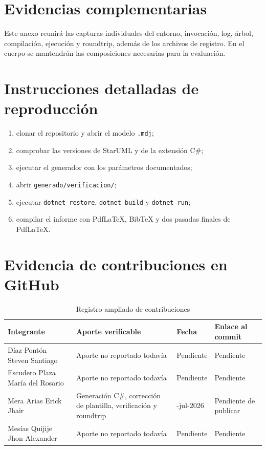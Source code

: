 \documentclass[12pt,a4paper]{article}
\begin{document}
\section{Evidencias complementarias}

Este anexo reunirá las capturas individuales del entorno, invocación, log,
árbol, compilación, ejecución y roundtrip, además de los archivos de registro.
En el cuerpo se mantendrán las composiciones necesarias para la evaluación.

\section{Instrucciones detalladas de reproducción}

\begin{enumerate}[nosep]
  \item clonar el repositorio y abrir el modelo \texttt{.mdj};
  \item comprobar las versiones de StarUML y de la extensión C\#;
  \item ejecutar el generador con los parámetros documentados;
  \item abrir \texttt{generado/verificacion/};
  \item ejecutar \texttt{dotnet restore}, \texttt{dotnet build} y \texttt{dotnet run};
  \item compilar el informe con PdfLaTeX, BibTeX y dos pasadas finales de
  PdfLaTeX.
\end{enumerate}

\section{Evidencia de contribuciones en GitHub}

\begin{table}[htbp]
  \centering
  \caption{Registro ampliado de contribuciones}
  \footnotesize
  \begin{tabularx}{\textwidth}{>{\raggedright\arraybackslash}p{3.5cm}X
    >{\raggedright\arraybackslash}p{2.5cm}
    >{\raggedright\arraybackslash}p{3cm}}
    \toprule
    Integrante & Aporte verificable & Fecha & Enlace al commit \\
    \midrule
    Díaz Pontón Steven Santiago & Aporte no reportado todavía & Pendiente & Pendiente \\
    Escudero Plaza María del Rosario & Aporte no reportado todavía & Pendiente & Pendiente \\
    Mera Arias Erick Jhair & Generación C\#, corrección de plantilla, verificación y roundtrip & 18-jul-2026 & Pendiente de publicar \\
    Mesías Quijije Jhon Alexander & Aporte no reportado todavía & Pendiente & Pendiente \\
    \bottomrule
  \end{tabularx}
\end{table}
\end{document}
